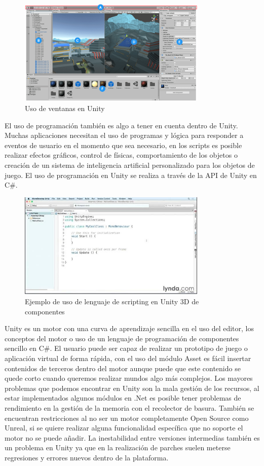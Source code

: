\documentclass[a4paper]{book}
\begin{document}
\begin{figure}[H]
    \centering
    \includegraphics[width=9cm, keepaspectratio]{img/editor_unity.png}
    \caption{Uso de ventanas en Unity}
    \label{editor_unity}
\end{figure}

El uso de programación también es algo a tener en cuenta dentro de Unity. Muchas aplicaciones necesitan el uso
de programas y lógica para responder a eventos de usuario en el momento que sea necesario, en los scripts es posible
realizar efectos gráficos, control de físicas, comportamiento de los objetos o creación de un sistema de inteligencia
artificial personalizado para los objetos de juego. El uso de programación en Unity se realiza a través de la
API de Unity en C\#.

\begin{figure}[H]
    \centering
    \includegraphics[width=9cm, keepaspectratio]{img/APIUnity.jpg}
    \caption{Ejemplo de uso de lenguaje de scripting en Unity 3D de componentes}
    \label{APIUnity}
\end{figure}

Unity es un motor con una curva de aprendizaje sencilla en el uso del editor, los conceptos del motor o uso de un
lenguaje de programación de componentes sencillo en C\#. El usuario puede ser capaz de realizar un prototipo de
juego o aplicación virtual de forma rápida, con el uso del módulo Asset es fácil insertar contenidos de terceros
dentro del motor aunque puede que este contenido se quede corto cuando queremos realizar mundos algo más complejos. Los mayores
problemas que podemos encontrar en Unity son la mala gestión de los recursos, al estar implementados
algunos módulos en .Net es posible tener problemas de rendimiento en la gestión de la memoria con el recolector de basura. También se
encuentran restricciones al no ser un motor completamente Open Source como Unreal, si se quiere realizar
alguna funcionalidad específica que no soporte el motor no se puede añadir. La inestabilidad entre versiones intermedias
también es un problema en Unity ya que en la realización de parches suelen meterse regresiones y errores nuevos dentro de
la plataforma. \cite{unity:_manual}
\end{document}
